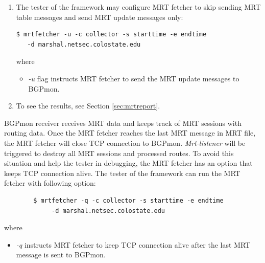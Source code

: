 \begin{enumerate}
 \item{The tester of the framework may configure MRT fetcher to skip sending MRT table messages and send MRT update messages only:}
 \begin{verbatim}
$ mrtfetcher -u -c collector -s starttime -e endtime 
   -d marshal.netsec.colostate.edu
\end{verbatim}
where
\begin{itemize}
\item{\emph{-u} flag instructs MRT fetcher to send the MRT update messages to BGPmon.}
\end{itemize}
  
  

\item{To see the results, see Section \ref{sec:mrtreport}.}
\end{enumerate} 

BGPmon receiver receives MRT data and keeps track of MRT sessions with routing data.   
Once the MRT fetcher reaches the last MRT message in MRT file, the MRT fetcher will close TCP connection to BGPmon.  \emph{Mrt-listener}  will be triggered to destroy all MRT sessions and processed routes. To avoid this  situation and help the tester in debugging, the MRT fetcher has an option that keeps TCP connection alive. The tester of the framework can run the MRT fetcher with following option:  


\begin{verbatim}
        $ mrtfetcher -q -c collector -s starttime -e endtime 
             -d marshal.netsec.colostate.edu
\end{verbatim}
where
\begin{itemize}
\item{\emph{-q} instructs MRT fetcher to keep TCP connection alive after the last MRT message is sent to BGPmon. } 
\end{itemize}

